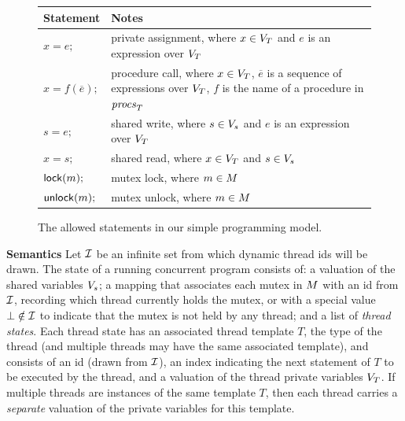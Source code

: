 \begin{figure}
\footnotesize
\center
\setlength{\tabcolsep}{0.45em}
\begin{tabular}{lp{6.8cm}}
\textbf{Statement} & \textbf{Notes} \\
\toprule

$x = e;$ & private assignment, where $x \in V_{T}$ and $e$ is an expression over $V_{T}$ \\
\midrule

$x = f(\overline{e});$ & procedure call, where $x \in V_{T}$, $\overline{e}$ is a sequence of expressions over $V_{T}$, $f$ is the name of a procedure in $\mathit{procs}_{T}$ \\
\midrule

$s = e;$ & shared write, where $s \in V_s$ and $e$ is an expression over $V_{T}$ \\
\midrule

$x = s;$ & shared read,  where $x \in V_{T}$ and $s \in V_s$ \\
\midrule

$\mathsf{lock}(m);$   & mutex lock, where $m \in M$ \\
\midrule

$\mathsf{unlock}(m);$ & mutex unlock, where $m \in M$\\
\bottomrule
\end{tabular}
\caption{The allowed statements in our simple programming model.}
\label{fig:statements}
\end{figure}

\noindent\textbf{Semantics }
%
Let $\mathcal{I}$ be an infinite set from which dynamic thread ids will be drawn.  The state of a running concurrent program consists of: a valuation of the shared variables $V_s$; a mapping that associates each mutex in $M$ with an id from $\mathcal{I}$, recording which thread currently holds the mutex, or with a special value $\bot \notin \mathcal{I}$ to indicate that the mutex is not held by any thread; and a list of \emph{thread states}.  Each thread state has an associated thread template $T$, the type of the thread (and multiple threads may have the same associated template), and consists of an id (drawn from $\mathcal{I}$), an index indicating the next statement of $T$ to be executed by the thread, and a valuation of the thread private variables $V_{T}$.  If multiple threads are instances of the same template $T$, then each thread carries a \emph{separate} valuation of the private variables for this template.

